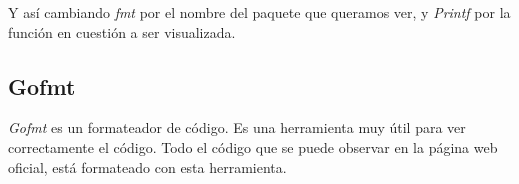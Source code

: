 	Y así cambiando \emph{fmt} por el nombre del paquete que queramos ver,
	y \emph{Printf} por la función en cuestión a ser visualizada.
	
	\subsection{Gofmt}
	
	\emph{Gofmt} es un formateador de código. Es una herramienta muy útil para
	ver correctamente el código. Todo el código que se puede observar en la
	página web oficial, está formateado con esta herramienta.
	


